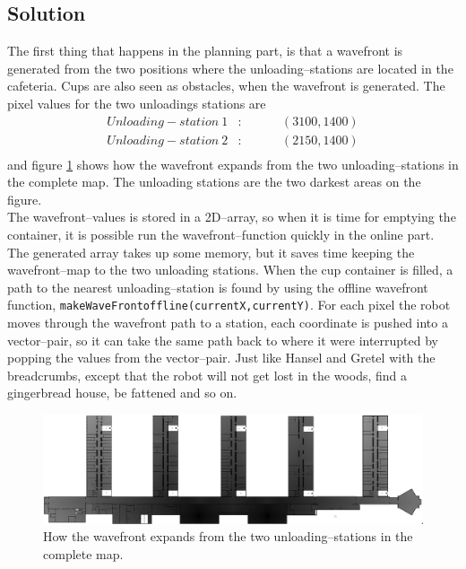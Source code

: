 \subsection{Solution}
The first thing that happens in the planning part, is that a wavefront is generated from the two positions where the unloading--stations are located in the cafeteria. Cups are also seen as obstacles, when the wavefront is generated. The pixel values for the two unloadings stations are 
\begin{eqnarray*}
Unloading-station\: 1&:& \hspace{1cm}(3100,1400) \\
Unloading-station\: 2&:& \hspace{1cm}(2150,1400) \\
\end{eqnarray*}
and figure \ref{fig::path} shows how the wavefront expands from the two unloading--stations in the complete map. The unloading stations are the two darkest areas on the figure.\\[.2cm]
The wavefront--values is stored in a 2D--array, so when it is time for emptying the container, it is possible run the wavefront--function quickly in the online part. The generated array takes up some memory, but it saves time keeping the wavefront--map to the two unloading stations. When the cup container is filled, a path to the nearest unloading--station is found by using the offline wavefront function, \lstinline|makeWaveFrontoffline(currentX,currentY)|. For each pixel the robot moves through the wavefront path to a station, each coordinate is pushed into a vector--pair, so it can take the same path back to where it were interrupted by popping the values from the vector--pair. Just like Hansel and Gretel with the breadcrumbs, except that the robot will not get lost in the woods, find a gingerbread house, be fattened and so on.  

\begin{figure}[H]
\centering
\includegraphics[scale=0.33]{img/wavefront_path.png}
\caption{How the wavefront expands from the two unloading--stations in the complete map.}
\label{fig::path}
\end{figure}

